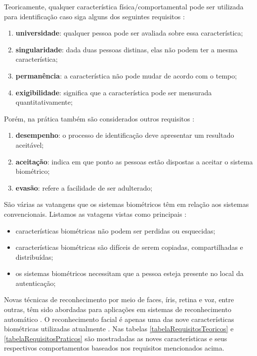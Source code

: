 Teoricamente, qualquer característica física/comportamental pode ser utilizada para identificação caso siga alguns dos seguintes requisitos \cite{milene}: 

	\begin{enumerate}
		\item \textbf{universidade}: qualquer pessoa pode ser avaliada sobre essa característica;
		\item \textbf{singularidade}: dada duas pessoas distinas, elas não podem ter a mesma característica;
		\item \textbf{permanência}: a característica não pode mudar de acordo com o tempo;
		\item \textbf{exigibilidade}: significa que a característica pode ser mensurada quantitativamente;
	\end{enumerate}

Porém, na prática também são considerados outros requisitos \cite{milene}:

	\begin{enumerate}
		\item \textbf{desempenho}: o processo de identificação deve apresentar um resultado aceitável;
		\item \textbf{aceitação}: indica em que ponto as pessoas estão dispostas a aceitar o sistema biométrico;
		\item \textbf{evasão}: refere a facilidade de ser adulterado;
	\end{enumerate}

São várias as vatangens que os sistemas biométricos têm em relação aos sistemas convencionais. Listamos as vatagens vistas como principais \cite{drovetto}:
	
	\begin{itemize}
		\item características biométricas não podem ser perdidas ou esquecidas;
		\item características biométricas são difíceis de serem copiadas, compartilhadas e distribuídas;
		\item os sistemas biométricos necessitam que a pessoa esteja presente no local da autenticação;
	\end{itemize}

Novas técnicas de reconhecimento por meio de faces, íris, retina e voz, entre outras, têm sido abordadas para aplicações em sistemas de reconhecimento automático \cite{bolle,saocarlos}. O reconhecimento facial é apenas uma das nove características biométricas utilizadas atualmente \cite{milene}. Nas tabelas \ref{tabelaRequisitosTeoricos} e \ref{tabelaRequisitosPraticos} são mostradadas as noves características e seus respectivos comportamentos baseados nos requisitos mencionados acima.
		
